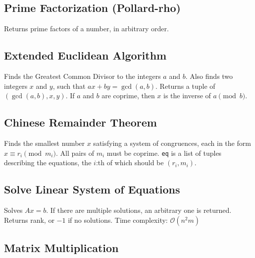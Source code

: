 \documentclass{article}
\begin{document}
\subsection*{Prime Factorization (Pollard-rho)}
Returns prime factors of a number, in arbitrary order.
\begin{multicols}{2}
  
  \columnbreak
  
\end{multicols}

\subsection*{Extended Euclidean Algorithm}
Finds the Greatest Common Divisor to the integers $a$ and $b$. Also finds two integers $x$ and $y$, such that $ax+by=\gcd(a,b)$.
Returns a tuple of $(\gcd(a, b), x, y)$. If $a$ and $b$ are coprime, then $x$ is the inverse of $a \pmod{b}$.
\begin{multicols}{2}
  
  \columnbreak
  
\end{multicols}

\subsection*{Chinese Remainder Theorem}
Finds the smallest number $x$ satisfying a system of congruences, each in the form $x \equiv r_i \pmod{m_i}$.
All pairs of $m_i$ must be coprime. \lstinline{eq} is a list of tuples describing the equations, the $i$:th of which should be $(r_i, m_i)$.
\begin{multicols}{2}
  
  \columnbreak
  
\end{multicols}

\subsection*{Solve Linear System of Equations}
Solves $A x = b$. If there are multiple solutions, an arbitrary one is returned.
Returns rank, or $-1$ if no solutions. Time complexity: $\mathcal{O}(n^2 m)$
\begin{multicols}{2}

\end{multicols}

\subsection*{Matrix Multiplication}

\end{document}
